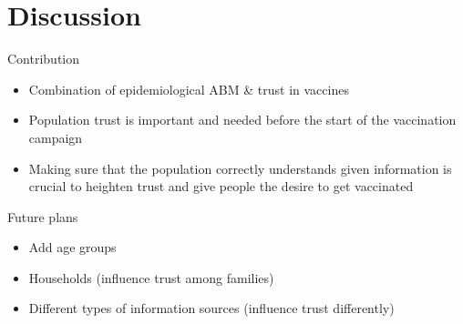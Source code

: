 \documentclass{beamer}
\begin{document}
\section{Discussion}

\begin{frame}{Contribution}
    \begin{itemize}
        \item Combination of epidemiological ABM \& trust in vaccines
        \item Population trust is important and needed before the start of the vaccination campaign
        \item Making sure that the population correctly understands given information is crucial to heighten trust and give people the desire to get vaccinated
    \end{itemize}
\end{frame}

\begin{frame}{Future plans}
    \begin{itemize}
        \item Add age groups
        \item Households (influence trust among families)
        \item Different types of information sources (influence trust differently)
    \end{itemize}
\end{frame}




%     

\end{document}
